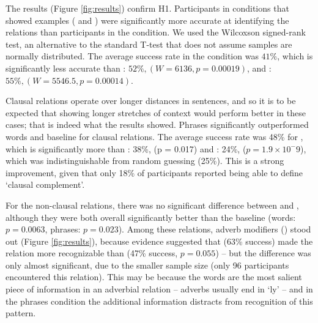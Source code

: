 The results (Figure \ref{fig:results}) confirm H1. Participants in conditions that showed examples ( and ) were significantly more accurate at identifying the relations than participants in the  condition. We used the Wilcoxson signed-rank test, an alternative to the standard T-test that does not assume samples are normally distributed. The average success rate in the  condition was $41\%$, which is significantly less accurate than : $52\%, (W = 6136, p = 0.00019)$, and : $55\%, (W = 5546.5, p = 0.00014)$.


Clausal relations operate over longer distances in sentences, and so it is to be expected that showing longer stretches of context would perform better in these cases; that is indeed what the results showed.
Phrases significantly outperformed words and baseline for clausal relations. The average success rate was 48\% for , which is significantly more than : 38\%, (p = 0.017) and : 24\%, ($p= 1.9 \times 10^-9$), which was indistinguishable from random guessing (25\%). This is a  strong improvement, given that only 18\% of participants reported being able to define  `clausal complement'.

For the non-clausal relations, there was no significant difference between  and , although they were both overall significantly better than the baseline (words: $p=0.0063$, phrases: $p=0.023$). Among these relations, adverb modifiers () stood out (Figure \ref{fig:results}), because evidence suggested that  (63\% success) made the relation more recognizable than  (47\% success, $p = 0.055$) -- but the difference was only almost significant, due to the smaller sample size (only 96 participants encountered this relation). This may be because the words are the most salient piece of information in an adverbial relation -- adverbs usually end in `ly' -- and in the phrases condition the additional information distracts from recognition of this pattern.

